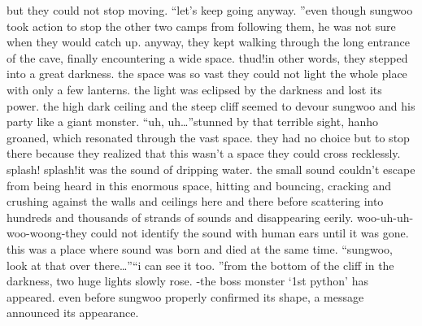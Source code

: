 but they could not stop moving.
“let’s keep going anyway.
”even though sungwoo took action to stop the other two camps from following them, he was not sure when they would catch up.
anyway, they kept walking through the long entrance of the cave, finally encountering a wide space.
thud!in other words, they stepped into a great darkness.
the space was so vast they could not light the whole place with only a few lanterns.
 the light was eclipsed by the darkness and lost its power.
the high dark ceiling and the steep cliff seemed to devour sungwoo and his party like a giant monster.
“uh, uh…”stunned by that terrible sight, hanho groaned, which resonated through the vast space.
they had no choice but to stop there because they realized that this wasn’t a space they could cross recklessly.
splash! splash!it was the sound of dripping water.
the small sound couldn’t escape from being heard in this enormous space, hitting and bouncing, cracking and crushing against the walls and ceilings here and there before scattering into hundreds and thousands of strands of sounds and disappearing eerily.
woo-uh-uh-woo-woong-they could not identify the sound with human ears until it was gone.
 this was a place where sound was born and died at the same time.
“sungwoo, look at that over there…”“i can see it too.
”from the bottom of the cliff in the darkness, two huge lights slowly rose.
-the boss monster ‘1st python’ has appeared.
even before sungwoo properly confirmed its shape, a message announced its appearance.

